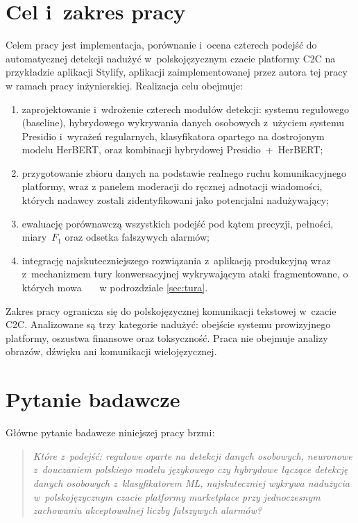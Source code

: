 \section{Cel i~zakres pracy}
\label{sec:cel}

Celem pracy jest implementacja, porównanie i~ocena czterech podejść do automatycznej
detekcji nadużyć w~polskojęzycznym czacie platformy C2C na przykładzie aplikacji
Stylify, aplikacji zaimplementowanej przez autora tej pracy w ramach pracy inżynierskiej. Realizacja celu obejmuje:

\begin{enumerate}
  \item zaprojektowanie i~wdrożenie czterech modułów detekcji: systemu regułowego
    (baseline), hybrydowego wykrywania danych osobowych z~użyciem systemu Presidio
    i~wyrażeń regularnych, klasyfikatora opartego na dostrojonym modelu HerBERT,
    oraz kombinacji hybrydowej Presidio~+~HerBERT;
  \item przygotowanie zbioru danych na podstawie realnego ruchu komunikacyjnego
    platformy, wraz z panelem moderacji do ręcznej adnotacji wiadomości, których nadawcy zostali zidentyfikowani jako potencjalni nadużywający;
  \item ewaluację porównawczą wszystkich podejść pod kątem precyzji, pełności,
    miary~$F_1$ oraz odsetka fałszywych alarmów;
  \item integrację najskuteczniejszego rozwiązania z~aplikacją produkcyjną
    wraz z~mechanizmem tury konwersacyjnej wykrywającym ataki fragmentowane, o których mowa ~~~w podrozdziale \ref {sec:tura}.
\end{enumerate}

Zakres pracy ogranicza się do polskojęzycznej komunikacji tekstowej w~czacie C2C.
Analizowane są trzy kategorie nadużyć: obejście systemu prowizyjnego platformy,
oszustwa finansowe oraz toksyczność. Praca nie obejmuje analizy obrazów, dźwięku
ani komunikacji wielojęzycznej.

\section{Pytanie badawcze}
\label{sec:pytanie}

Główne pytanie badawcze niniejszej pracy brzmi:

\begin{quote}
\textit{Które z~podejść: regułowe oparte na detekcji danych osobowych, neuronowe z~douczaniem
polskiego modelu językowego czy hybrydowe łączące detekcję danych osobowych z~klasyfikatorem ML,
najskuteczniej wykrywa nadużycia w~polskojęzycznym czacie platformy marketplace
przy jednoczesnym zachowaniu akceptowalnej liczby fałszywych alarmów?}
\end{quote}

